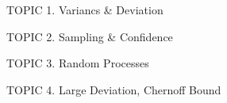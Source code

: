 \documentclass[handout]{mcs}
\begin{document}
\renewcommand{\reading}{
}

\begin{staffnotes}
TOPIC 1.  Variancs \& Deviation

TOPIC 2.  Sampling \& Confidence

TOPIC 3.  Random Processes

TOPIC 4.  Large Deviation, Chernoff Bound
\end{staffnotes}

\end{document}
